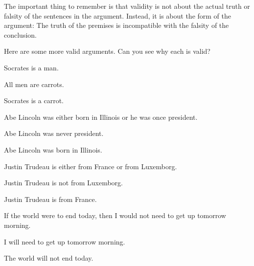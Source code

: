 The important thing to remember is that validity is not about the actual truth or falsity of the sentences in the argument. Instead, it is about the form of the argument: The truth of the premises is incompatible with the falsity of the conclusion.

Here are some more valid arguments. Can you see why each is valid?

\begin{earg}
\item Socrates is a man.
\item All men are carrots.
\item{\therefore} Socrates is a carrot.
\end{earg}


\begin{earg}
\item Abe Lincoln was either born in Illinois or he was once president.
\item Abe Lincoln was never president.
\item[\therefore] Abe Lincoln was born in Illinois.
\end{earg}

\begin{earg}
\item Justin Trudeau is either from France or from Luxemborg.
\item Justin Trudeau is not from Luxemborg.
\item[\therefore] Justin Trudeau is from France.
\end{earg}


\begin{earg}
\item If the world were to end today, then I would not need to get up tomorrow morning.
\item I will need to get up tomorrow morning.
\item[\therefore] The world will not end today.
\end{earg}


